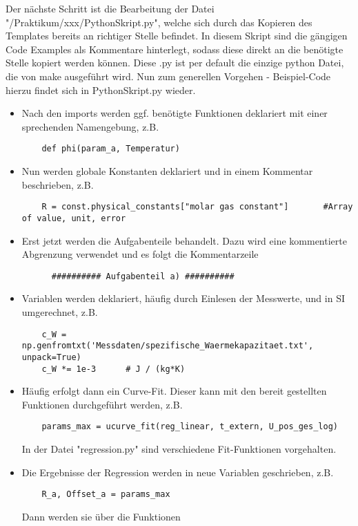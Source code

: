 Der nächste Schritt ist die Bearbeitung der Datei "/Praktikum/xxx/PythonSkript.py", welche sich durch das Kopieren des Templates bereits an richtiger Stelle befindet. In diesem Skript sind die gängigen Code Examples als Kommentare hinterlegt, sodass diese direkt an die benötigte Stelle kopiert werden können. Diese .py ist per default die einzige python Datei, die von make ausgeführt wird. Nun zum generellen Vorgehen - Beispiel-Code hierzu findet sich in PythonSkript.py wieder.
\begin{itemize}
  \item Nach den imports werden ggf. benötigte Funktionen deklariert mit einer sprechenden Namengebung, z.B.
  \begin{lstlisting}
    def phi(param_a, Temperatur)
  \end{lstlisting}
  \item Nun werden globale Konstanten deklariert und in einem Kommentar beschrieben, z.B.
  \begin{lstlisting}
    R = const.physical_constants["molar gas constant"]       #Array of value, unit, error
  \end{lstlisting}
  \item Erst jetzt werden die Aufgabenteile behandelt. Dazu wird eine kommentierte Abgrenzung verwendet und es folgt die Kommentarzeile
  \begin{lstlisting}
      ########## Aufgabenteil a) ##########
  \end{lstlisting}
  \item Variablen werden deklariert, häufig durch Einlesen der Messwerte, und in SI umgerechnet, z.B.
  \begin{lstlisting}
    c_W = np.genfromtxt('Messdaten/spezifische_Waermekapazitaet.txt', unpack=True)
    c_W *= 1e-3      # J / (kg*K)
  \end{lstlisting}
  \item Häufig erfolgt dann ein Curve-Fit. Dieser kann mit den bereit gestellten Funktionen durchgeführt werden, z.B.
  \begin{lstlisting}
    params_max = ucurve_fit(reg_linear, t_extern, U_pos_ges_log)
  \end{lstlisting}
  In der Datei "regression.py" sind verschiedene Fit-Funktionen vorgehalten.
  \item Die Ergebnisse der Regression werden in neue Variablen geschrieben, z.B.
  \begin{lstlisting}
    R_a, Offset_a = params_max
  \end{lstlisting}
  Dann werden sie über die Funktionen

\end{itemize}
